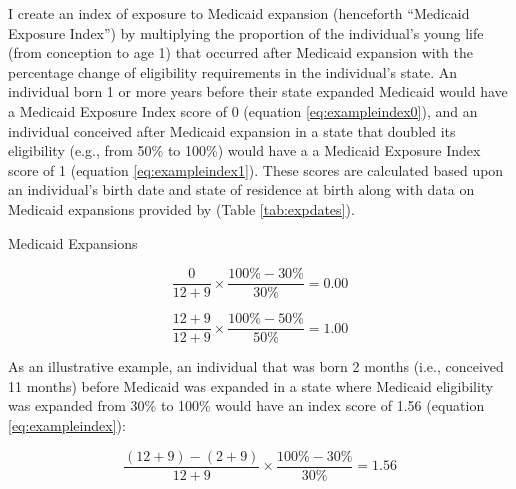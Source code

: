 \documentclass[12pt]{article}
\begin{document}
I create an index of exposure to Medicaid expansion (henceforth ``Medicaid Exposure Index'') by multiplying the proportion of the individual's young life (from conception to age 1) that occurred after Medicaid expansion with the percentage change of eligibility requirements in the individual's state. An individual born 1 or more years before their state expanded Medicaid would have a Medicaid Exposure Index score of 0 (equation \ref{eq:exampleindex0}), and an individual conceived after Medicaid expansion in a state that doubled its eligibility (e.g., from 50\% to 100\%) would have a a Medicaid Exposure Index score of 1 (equation \ref{eq:exampleindex1}). These scores are calculated based upon an individual's birth date and state of residence at birth along with data on Medicaid expansions provided by \citet{torresExpandingMedicaidCoverage1989} (Table \ref{tab:expdates}).


\begin{table}[h]
\centering
\caption{Medicaid Expansions} \label{tab:expdates}
\begin{threeparttable}
  \footnotesize
  
\end{threeparttable}
\end{table}


\begin{equation}
  \label{eq:exampleindex0}
  \frac{0}{12+9} \times \frac{100\%-30\%}{30\%} = 0.00
\end{equation}

\begin{equation}
  \label{eq:exampleindex1}
  \frac{12+9}{12+9} \times \frac{100\%-50\%}{50\%} = 1.00
\end{equation}

As an illustrative example, an individual that was born 2 months (i.e., conceived 11 months) before Medicaid was expanded in a state where Medicaid eligibility was expanded from 30\% to 100\% would have an index score of 1.56 (equation \ref{eq:exampleindex}):


\begin{equation}
  \label{eq:exampleindex}
  \frac{(12+9)-(2 + 9)}{12+9} \times \frac{100\%-30\%}{30\%} = 1.56
\end{equation}
\end{document}
